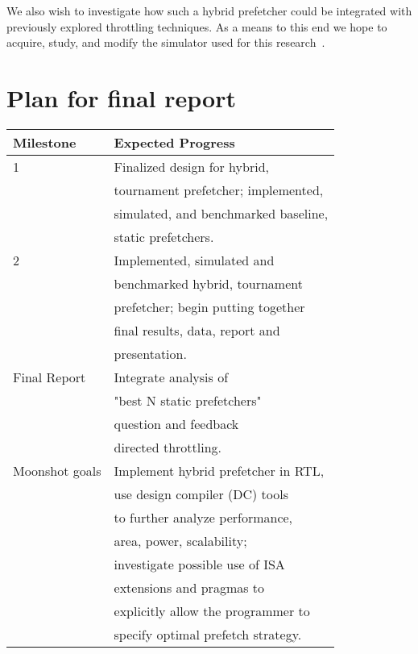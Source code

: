 \documentclass[pageno]{jpaper}
\begin{document}
We also wish to investigate how such a hybrid prefetcher could be integrated with previously explored throttling 
techniques. As a means to this end we hope to acquire, study, and modify the simulator used for this research~\cite{srinath07}.

\newpage
\section{Plan for final report}


\begin{table}[h!]
  \centering
  \begin{tabular}{|l|l|}
    \hline
    \textbf{Milestone} & \textbf{Expected Progress}\\
    \hline
    \hline
    1 & Finalized design for hybrid, \\
        &tournament prefetcher; implemented, \\
        &simulated, and benchmarked baseline, \\
        &static prefetchers.\\
    \hline
    2 & Implemented, simulated and \\
        &benchmarked hybrid, tournament \\
        &prefetcher; begin putting together\\
        &final results, data, report and \\
        &presentation.\\
    \hline
    Final Report & Integrate analysis of \\
                    &"best N static prefetchers"\\
                    &question and feedback \\
                    &directed throttling.\\
    \hline
    Moonshot goals & Implement hybrid prefetcher in RTL,\\
                    &use design compiler (DC) tools \\
                    &to further analyze performance, \\
                    &area, power, scalability;\\
                    &investigate possible use of ISA \\
                    &extensions and pragmas to \\
                    &explicitly allow the programmer to\\
                    &specify optimal prefetch strategy.\\
    \hline
  \end{tabular}
  \label{table:formatting}
\end{table}





\end{document}
